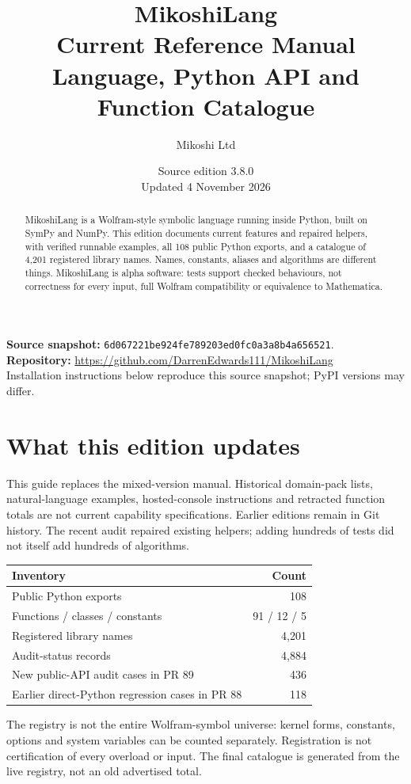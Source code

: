 \documentclass[11pt,a4paper]{article}
\title{\Huge\textbf{MikoshiLang}\\[8pt]\Large Current Reference Manual\\[6pt]\large Language, Python API and Function Catalogue}
\author{Mikoshi Ltd}
\date{Source edition 3.8.0\\Updated 4 November 2026}
\begin{document}
\sloppy
\maketitle\thispagestyle{empty}
\begin{abstract}
MikoshiLang is a Wolfram-style symbolic language running inside Python, built on SymPy and NumPy. This edition documents current features and repaired helpers, with verified runnable examples, all 108 public Python exports, and a catalogue of 4,201 registered library names. Names, constants, aliases and algorithms are different things. MikoshiLang is alpha software: tests support checked behaviours, not correctness for every input, full Wolfram compatibility or equivalence to Mathematica.
\end{abstract}
\vfill
\textbf{Source snapshot:} \texttt{6d067221be924fe789203ed0fc0a3a8b4a656521}.\\
\textbf{Repository:} \url{https://github.com/DarrenEdwards111/MikoshiLang}\\
Installation instructions below reproduce this source snapshot; PyPI versions may differ.
\newpage\tableofcontents\newpage

\section{What this edition updates}
This guide replaces the mixed-version manual. Historical domain-pack lists, natural-language examples, hosted-console instructions and retracted function totals are not current capability specifications. Earlier editions remain in Git history. The recent audit repaired existing helpers; adding hundreds of tests did not itself add hundreds of algorithms.
\begin{center}\begin{tabular}{lr}\toprule
\textbf{Inventory} & \textbf{Count}\\\midrule
Public Python exports & 108\\
Functions / classes / constants & 91 / 12 / 5\\
Registered library names & 4,201\\
Audit-status records & 4,884\\
New public-API audit cases in PR 89 & 436\\
Earlier direct-Python regression cases in PR 88 & 118\\\bottomrule
\end{tabular}\end{center}
The registry is not the entire Wolfram-symbol universe: kernel forms, constants, options and system variables can be counted separately. Registration is not certification of every overload or input. The final catalogue is generated from the live registry, not an old advertised total.
\end{document}
